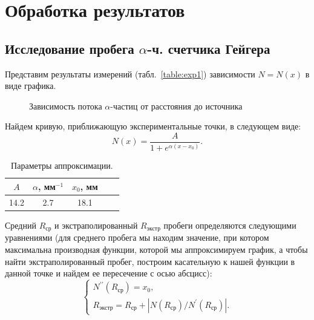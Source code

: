 \documentclass[a4paper,12pt]{article} %
\begin{document}
	\section{Обработка результатов}
		\subsection{Исследование пробега $\alpha$-ч. счетчика Гейгера}	
		Представим результаты измерений (табл.~\ref{table:exp1}) зависимости $N=N(x)$ в виде графика. 
		
		\begin{figure}[h!]
			\centering
			\begin{floatrow}
				
				\caption{Зависимость потока $\alpha$-частиц от расстояния до источника}  
			\end{floatrow}
		\end{figure}
	
		Найдем кривую, приближающую экспериментальные точки, в следующем виде:
		\begin{equation*}
			N (x) = \frac{A}{1+e^{\alpha(x-x_0)}}.
		\end{equation*}
	
		\begin{table}[H]
			\caption{Параметры аппроксимации.}
			\label{tab:pfrfmetry1}
			\begin{tabular}{|c|c|c|c|c|}
				\hline
				$A$ & $\alpha$, мм$^{-1}$ & $x_0$, мм \\ \hline
				14.2  & 2.7    & 18.1         \\ \hline
			\end{tabular}
		\end{table}
	
		Средний $R_\text{ср}$ и экстраполированный $R_\text{экстр}$ пробеги определяются следующими уравнениями (для среднего пробега мы находим значение, при котором максимальна производная функции, которой мы аппроксимируем график, а чтобы найти экстраполированный пробег, построим касательную к нашей функции в данной точке и найдем ее пересечение с осью абсцисс):
		\begin{equation*}
			\begin{cases}
				N^{\prime \prime} (R_\text{ср}) = x_0, \\
				R_\text{экстр} = R_\text{ср} + \left|N(R_\text{ср})/N^\prime(R_\text{ср})\right|.
			\end{cases}
		\end{equation*}
	
\end{document}
